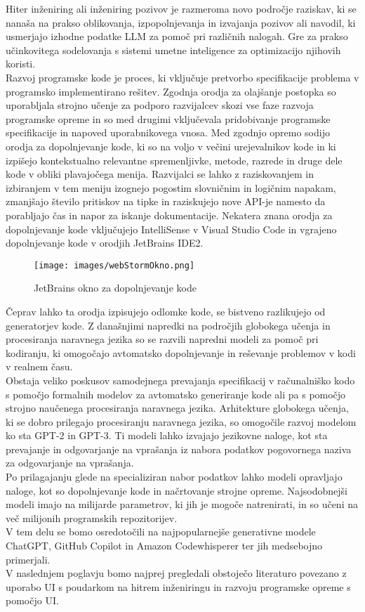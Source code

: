 \documentclass[a4paper,12pt,openright]{book}
\begin{document}
Hiter inženiring ali inženiring pozivov je razmeroma novo področje raziskav, ki se nanaša na prakso oblikovanja, izpopolnjevanja in izvajanja pozivov ali navodil, ki usmerjajo izhodne podatke LLM za pomoč pri različnih nalogah. Gre za prakso učinkovitega sodelovanja s sistemi umetne inteligence za optimizacijo njihovih koristi. \cite{info:doi/10.2196/50638} \\
Razvoj programske kode je proces, ki vključuje pretvorbo specifikacije problema v programsko implementirano rešitev. Zgodnja orodja za olajšanje postopka so uporabljala strojno učenje za podporo razvijalcev skozi vse faze razvoja programske opreme in so med drugimi vključevala pridobivanje programske specifikacije in napoved uporabnikovega vnosa.
Med zgodnjo opremo sodijo orodja za dopolnjevanje kode, ki so na voljo v večini urejevalnikov kode in ki izpišejo kontekstualno relevantne spremenljivke, metode, razrede in druge dele kode v obliki plavajočega menija. Razvijalci se lahko z raziskovanjem in izbiranjem v tem meniju izognejo pogostim slovničnim in logičnim napakam, zmanjšajo število pritiskov na tipke in raziskujejo nove API-je namesto da porabljajo čas in napor za iskanje dokumentacije. Nekatera znana orodja za dopolnjevanje kode vključujejo IntelliSense v Visual Studio Code in vgrajeno dopolnjevanje kode v orodjih JetBrains IDE2. \cite{hu2019re} \\
\begin{figure}[H]
    \centering
    \texttt{[image: images/webStormOkno.png]}
    \caption{JetBrains okno za dopolnjevanje kode}
    \label{fig:jetBrainsOkno}
\end{figure}

Čeprav lahko ta orodja izpisujejo odlomke kode, se bistveno razlikujejo od generatorjev kode.
Z današnjimi napredki na področjih globokega učenja in procesiranja naravnega jezika so se razvili napredni modeli za pomoč pri kodiranju, ki omogočajo avtomatsko dopolnjevanje in reševanje problemov v kodi v realnem času. \\
Obstaja veliko poskusov samodejnega prevajanja specifikacij v računalniško kodo s pomočjo formalnih modelov za avtomatsko generiranje kode ali pa s pomočjo strojno naučenega procesiranja naravnega jezika. Arhitekture globokega učenja, ki se dobro prilegajo procesiranju naravnega jezika, so omogočile razvoj modelom ko sta GPT-2 in GPT-3. Ti modeli lahko izvajajo jezikovne naloge, kot sta prevajanje in odgovarjanje na vprašanja iz nabora podatkov pogovornega naziva za odgovarjanje na vprašanja. \cite{hu2019re} \\
Po prilagajanju glede na specializiran nabor podatkov lahko modeli opravljajo naloge, kot so dopolnjevanje kode in načrtovanje strojne opreme.  Najsodobnejši modeli imajo na milijarde parametrov, ki jih je mogoče natrenirati, in so učeni na več milijonih programskih repozitorijev.  \cite{hu2019re} \\
V tem delu se bomo osredotočili na najpopularnejše generativne modele ChatGPT, GitHub Copilot in Amazon Codewhisperer ter jih medsebojno primerjali. \\
\pagebreak
V naslednjem poglavju bomo najprej pregledali obstoječo literaturo povezano z uporabo UI s poudarkom na hitrem inženiringu in razvoju programske opreme s pomočjo UI. 
\end{document}
